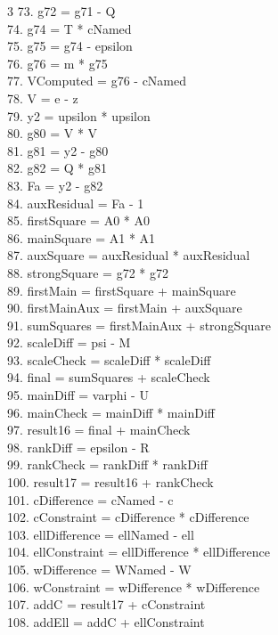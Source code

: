 \documentclass[10pt]{article}
\begin{document}
\begin{multicols}{3}
73. g72 = g71 - Q\\
74. g74 = T * cNamed\\
75. g75 = g74 - epsilon\\
76. g76 = m * g75\\
77. VComputed = g76 - cNamed\\
78. V = e - z\\
79. y2 = upsilon * upsilon\\
80. g80 = V * V\\
81. g81 = y2 - g80\\
82. g82 = Q * g81\\
83. Fa = y2 - g82\\
84. auxResidual = Fa - 1\\
85. firstSquare = A0 * A0\\
86. mainSquare = A1 * A1\\
87. auxSquare = auxResidual * auxResidual\\
88. strongSquare = g72 * g72\\
89. firstMain = firstSquare + mainSquare\\
90. firstMainAux = firstMain + auxSquare\\
91. sumSquares = firstMainAux + strongSquare\\
92. scaleDiff = psi - M\\
93. scaleCheck = scaleDiff * scaleDiff\\
94. final = sumSquares + scaleCheck\\
95. mainDiff = varphi - U\\
96. mainCheck = mainDiff * mainDiff\\
97. result16 = final + mainCheck\\
98. rankDiff = epsilon - R\\
99. rankCheck = rankDiff * rankDiff\\
100. result17 = result16 + rankCheck\\
101. cDifference = cNamed - c\\
102. cConstraint = cDifference * cDifference\\
103. ellDifference = ellNamed - ell\\
104. ellConstraint = ellDifference * ellDifference\\
105. wDifference = WNamed - W\\
106. wConstraint = wDifference * wDifference\\
107. addC = result17 + cConstraint\\
108. addEll = addC + ellConstraint\\

\end{multicols}
\end{document}
